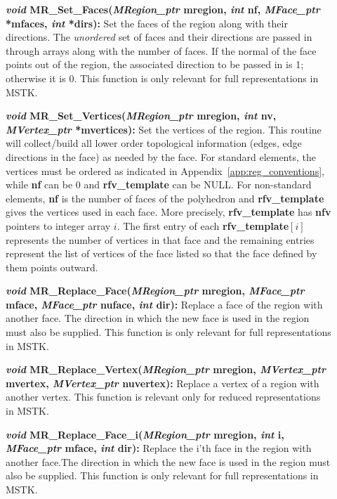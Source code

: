 \documentclass[12pt]{article}
\begin{document}
\begin{description}
\item[]\textbf{\textit{void} MR\_Set\_Faces(\textit{MRegion\_ptr}
    mregion, \textit{int} nf, \textit{MFace\_ptr} *mfaces,
    \textit{int} *dirs):} Set the faces of the region along with their
  directions. The \textit{unordered} set of faces and their directions
  are passed in through arrays along with the number of faces. If the
  normal of the face points out of the region, the associated
  direction to be passed in is 1; otherwise it is 0. This function is
  only relevant for full representations in MSTK.
  
\item[]\textbf{\textit{void} MR\_Set\_Vertices(\textit{MRegion\_ptr}
    mregion, \textit{int} nv, \textit{MVertex\_ptr} *mvertices):} Set
  the vertices of the region. This routine will collect/build all
  lower order topological information (edges, edge directions in the
  face) as needed by the face. For standard elements, the vertices
  must be ordered as indicated in Appendix~\ref{app:reg_conventions},
  while \textbf{nf} can be 0 and \textbf{rfv\_template} can be NULL.
  For non-standard elements, \textbf{nf} is the number of faces of the
  polyhedron and \textbf{rfv\_template} gives the vertices used in each
  face. More precisely, \textbf{rfv\_template} has \textbf{nfv}
  pointers to integer array $i$. The first entry of each
  \textbf{rfv\_template$[i]$} represents the number of vertices in that
  face and the remaining entries represent the list of vertices of the
  face listed so that the face defined by them points outward.
  
\item[]\textbf{\textit{void} MR\_Replace\_Face(\textit{MRegion\_ptr}
    mregion, \textit{MFace\_ptr} mface, \textit{MFace\_ptr} nuface,
    \textit{int} dir):} Replace a face of the region with another
  face. The direction in which the new face is used in the region must
  also be supplied. This function is only relevant for full
  representations in MSTK.
  
\item[]\textbf{\textit{void} MR\_Replace\_Vertex(\textit{MRegion\_ptr}
    mregion, \textit{MVertex\_ptr} mvertex, \textit{MVertex\_ptr}
    nuvertex):} Replace a vertex of a region with another vertex. This
  function is relevant only for reduced representations in MSTK.
  
\item[]\textbf{\textit{void}
    MR\_Replace\_Face\_i(\textit{MRegion\_ptr} mregion, \textit{int}
    i, \textit{MFace\_ptr} mface, \textit{int} dir):} Replace the i'th
  face in the region with another face.The direction in which the new
  face is used in the region must also be supplied. This function is
  only relevant for full representations in MSTK.
  

\end{description}
\end{document}
